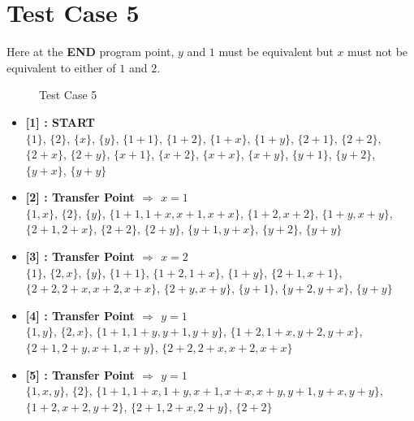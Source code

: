 \begin{itemize}
\end{itemize}

\section{Test Case 5}
\label{sec:tc5}
Here at the \textbf{END} program point, $y$ and $1$ must be equivalent but
$x$ must not be equivalent to either of $1$ and $2$.

\begin{figure}[H]
\label{fig:tc5}
    \caption{Test Case 5}
\end{figure}

\begin{itemize}

    \item \textbf{[1] : START}\\
        $\{1\}$, $\{2\}$, $\{x\}$, $\{y\}$, $\{1 + 1\}$, $\{1 + 2\}$, $\{1 + x\}$, $\{1 + y\}$, $\{2 + 1\}$, $\{2 + 2\}$, $\{2 + x\}$, $\{2 + y\}$, $\{x + 1\}$, $\{x + 2\}$, $\{x + x\}$, $\{x + y\}$, $\{y + 1\}$, $\{y + 2\}$, $\{y + x\}$, $\{y + y\}$

    \item \textbf{[2] : Transfer Point $\Rightarrow$ $x = 1$}\\
        $\{1, x\}$, $\{2\}$, $\{y\}$, $\{1 + 1, 1 + x, x + 1, x + x\}$, $\{1 + 2, x + 2\}$, $\{1 + y, x + y\}$, $\{2 + 1, 2 + x\}$, $\{2 + 2\}$, $\{2 + y\}$, $\{y + 1, y + x\}$, $\{y + 2\}$, $\{y + y\}$

    \item \textbf{[3] : Transfer Point $\Rightarrow$ $x = 2$}\\
        $\{1\}$, $\{2, x\}$, $\{y\}$, $\{1 + 1\}$, $\{1 + 2, 1 + x\}$, $\{1 + y\}$, $\{2 + 1, x + 1\}$, $\{2 + 2, 2 + x, x + 2, x + x\}$, $\{2 + y, x + y\}$, $\{y + 1\}$, $\{y + 2, y + x\}$, $\{y + y\}$

    \item \textbf{[4] : Transfer Point $\Rightarrow$ $y = 1$}\\
        $\{1, y\}$, $\{2, x\}$, $\{1 + 1, 1 + y, y + 1, y + y\}$, $\{1 + 2, 1 + x, y + 2, y + x\}$, $\{2 + 1, 2 + y, x + 1, x + y\}$, $\{2 + 2, 2 + x, x + 2, x + x\}$

    \item \textbf{[5] : Transfer Point $\Rightarrow$ $y = 1$}\\
        $\{1, x, y\}$, $\{2\}$, $\{1 + 1, 1 + x, 1 + y, x + 1, x + x, x + y, y + 1, y + x, y + y\}$, $\{1 + 2, x + 2, y + 2\}$, $\{2 + 1, 2 + x, 2 + y\}$, $\{2 + 2\}$


\end{itemize}
